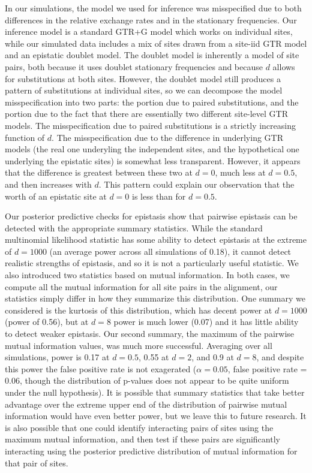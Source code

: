 \documentclass[11pt]{article}
\begin{document}
In our simulations, the model we used for inference was misspecified due to both differences in the relative exchange rates and in the stationary frequencies.
Our inference model is a standard GTR+G model which works on individual sites, while our simulated data includes a mix of sites drawn from a site-iid GTR model and an epistatic doublet model.
The doublet model is inherently a model of site pairs, both because it uses doublet stationary frequencies and because $d$ allows for substitutions at both sites.
However, the doublet model still produces a pattern of substitutions at individual sites, so we can decompose the model misspecification into two parts: the portion due to paired substitutions, and the portion due to the fact that there are essentially two different site-level GTR models.
The misspecification due to paired substitutions is a strictly increasing function of $d$.
The misspecification due to the difference in underlying GTR models (the real one underyling the independent sites, and the hypothetical one underlying the epistatic sites) is somewhat less transparent.
However, it appears that the difference is greatest between these two at $d = 0$, much less at $d = 0.5$, and then increases with $d$.
This pattern could explain our observation that the worth of an epistatic site at $d = 0$ is less than for $d = 0.5$.

Our posterior predictive checks for epistasis show that pairwise epistasis can be detected with the appropriate summary statistics.
While the standard multinomial likelihood statistic has some ability to detect epistasis at the extreme of $d = 1000$ (an average power across all simulations of 0.18), it cannot detect realistic strengths of epistasis, and so it is not a particularly useful statistic.
We also introduced two statistics based on mutual information.
In both cases, we compute all the mutual information for all site pairs in the alignment, our statistics simply differ in how they summarize this distribution.
One summary we considered is the kurtosis of this distribution, which has decent power at $d = 1000$ (power of 0.56), but at $d = 8$ power is much lower (0.07) and it has little ability to detect weaker epistasis.
Our second summary, the maximum of the pairwise mutual information values, was much more successful.
Averaging over all simulations, power is 0.17 at $d = 0.5$, 0.55 at $d = 2$, and 0.9 at $d = 8$, and despite this power the false positive rate is not exagerated ($\alpha = 0.05$, false positive rate = 0.06, though the distribution of p-values does not appear to be quite uniform under the null hypothesis).
It is possible that summary statistics that take better advantage over the extreme upper end of the distribution of pairwise mutual information would have even better power, but we leave this to future research.
It is also possible that one could identify interacting pairs of sites using the maximum mutual information, and then test if these pairs are significantly interacting using the posterior predictive distribution of mutual information for that pair of sites.
\end{document}
